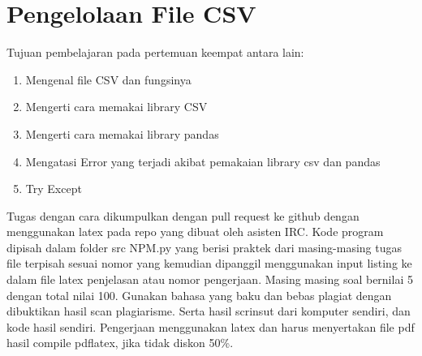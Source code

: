 \chapter{Pengelolaan File CSV}

Tujuan pembelajaran pada pertemuan keempat antara lain:
\begin{enumerate}
\item
Mengenal file CSV dan fungsinya 
\item
Mengerti cara memakai library CSV
\item
Mengerti cara memakai library pandas
\item
Mengatasi Error yang terjadi akibat pemakaian library csv dan pandas
\item
Try Except
\end{enumerate}
Tugas dengan cara dikumpulkan dengan pull request ke github dengan menggunakan latex pada repo yang dibuat oleh asisten IRC. Kode program dipisah dalam folder src NPM.py yang berisi praktek dari masing-masing tugas file terpisah sesuai nomor yang kemudian dipanggil menggunakan input listing ke dalam file latex penjelasan atau nomor pengerjaan. Masing masing soal bernilai 5 dengan total nilai 100. Gunakan bahasa yang baku dan bebas plagiat dengan dibuktikan hasil scan plagiarisme. Serta hasil scrinsut dari komputer sendiri, dan kode hasil sendiri. Pengerjaan menggunakan latex dan harus menyertakan file pdf hasil compile pdflatex, jika tidak diskon 50\%.


